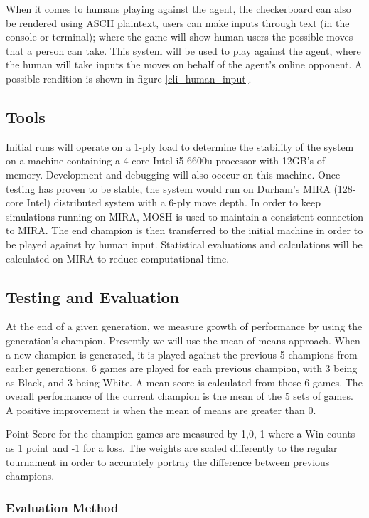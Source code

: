 \documentclass[12pt,a4paper]{article}
\begin{document}
    When it comes to humans playing against the agent, the checkerboard can also be rendered using ASCII plaintext, users can make inputs through text (in the console or terminal); where the game will show human users the possible moves that a person can take. This system will be used to play against the agent, where the human will take inputs the moves on behalf of the agent's online opponent. A possible rendition is shown in figure \ref{cli_human_input}.


    \subsection*{Tools}

    Initial runs will operate on a 1-ply load to determine the stability of the system on a machine containing a 4-core Intel i5 6600u processor with 12GB's of memory. Development and debugging will also occcur on this machine. Once testing has proven to be stable, the system would run on Durham's MIRA (128-core Intel) distributed system with a 6-ply move depth. In order to keep simulations running on MIRA, MOSH is used to maintain a consistent connection to MIRA. The end champion is then transferred to the initial machine in order to be played against by human input. Statistical evaluations and calculations will be calculated on MIRA to reduce computational time.

\subsection*{Testing and Evaluation}

    At the end of a given generation, we measure growth of performance by using the generation's champion. Presently we will use the mean of means approach. When a new champion is generated, it is played against the previous 5 champions from earlier generations. 6 games are played for each previous champion, with 3 being as Black, and 3 being White. A mean score is calculated from those 6 games. The overall performance of the current champion is the mean of the 5 sets of games. A positive improvement is when the mean of means are greater than 0. 

    Point Score for the champion games are measured by {1,0,-1} where a Win counts as 1 point and -1 for a loss. The weights are scaled differently to the regular tournament in order to accurately portray the difference between previous champions.

    \subsubsection*{Evaluation Method}
\end{document}
